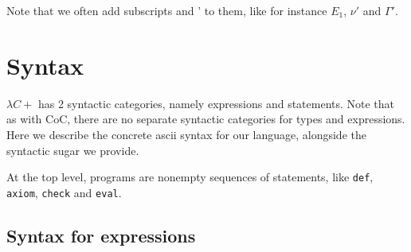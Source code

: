 \documentclass{article}
\begin{document}
Note that we often add subscripts and ' to them, like for instance
$E_1$, $\nu'$ and $\Gamma'$.

\section{Syntax}

$\lambda C+$ has 2 syntactic categories, namely expressions and statements.
Note that as with CoC, there are no separate syntactic categories for types and
expressions.
Here we describe the concrete ascii syntax for our language, alongside
the syntactic sugar we provide.

At the top level, programs are nonempty sequences of statements,
like \texttt{def}, \texttt{axiom}, \texttt{check} and \texttt{eval}.


\subsection{Syntax for expressions}


\end{document}

